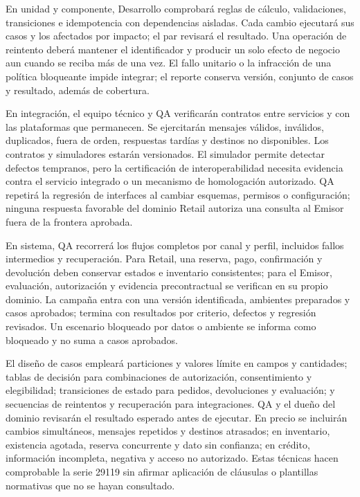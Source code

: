 \documentclass[11pt]{article}
\begin{document}
En unidad y componente, Desarrollo comprobará reglas de cálculo, validaciones, transiciones e idempotencia con dependencias aisladas. Cada cambio ejecutará sus casos y los afectados por impacto; el par revisará el resultado. Una operación de reintento deberá mantener el identificador y producir un solo efecto de negocio aun cuando se reciba más de una vez. El fallo unitario o la infracción de una política bloqueante impide integrar; el reporte conserva versión, conjunto de casos y resultado, además de cobertura.

En integración, el equipo técnico y QA verificarán contratos entre servicios y con las plataformas que permanecen. Se ejercitarán mensajes válidos, inválidos, duplicados, fuera de orden, respuestas tardías y destinos no disponibles. Los contratos y simuladores estarán versionados. El simulador permite detectar defectos tempranos, pero la certificación de interoperabilidad necesita evidencia contra el servicio integrado o un mecanismo de homologación autorizado. QA repetirá la regresión de interfaces al cambiar esquemas, permisos o configuración; ninguna respuesta favorable del dominio Retail autoriza una consulta al Emisor fuera de la frontera aprobada.

En sistema, QA recorrerá los flujos completos por canal y perfil, incluidos fallos intermedios y recuperación. Para Retail, una reserva, pago, confirmación y devolución deben conservar estados e inventario consistentes; para el Emisor, evaluación, autorización y evidencia precontractual se verifican en su propio dominio. La campaña entra con una versión identificada, ambientes preparados y casos aprobados; termina con resultados por criterio, defectos y regresión revisados. Un escenario bloqueado por datos o ambiente se informa como bloqueado y no suma a casos aprobados.

El diseño de casos empleará particiones y valores límite en campos y cantidades; tablas de decisión para combinaciones de autorización, consentimiento y elegibilidad; transiciones de estado para pedidos, devoluciones y evaluación; y secuencias de reintentos y recuperación para integraciones. QA y el dueño del dominio revisarán el resultado esperado antes de ejecutar. En precio se incluirán cambios simultáneos, mensajes repetidos y destinos atrasados; en inventario, existencia agotada, reserva concurrente y dato sin confianza; en crédito, información incompleta, negativa y acceso no autorizado. Estas técnicas hacen comprobable la serie 29119 sin afirmar aplicación de cláusulas o plantillas normativas que no se hayan consultado.
\end{document}
